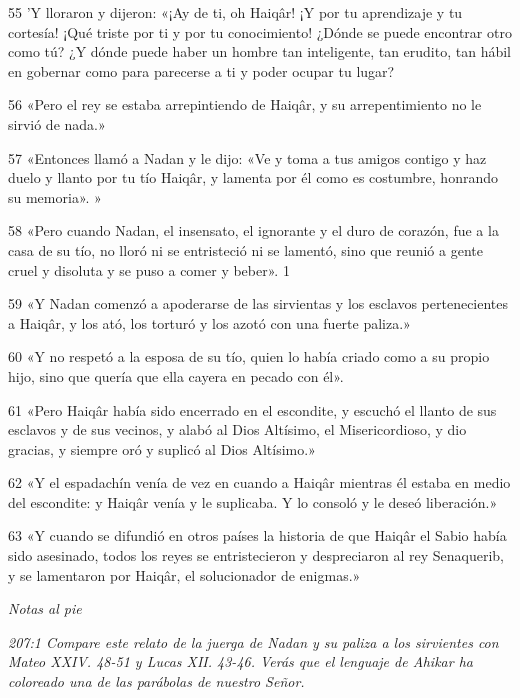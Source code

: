 \par 55 'Y lloraron y dijeron: «¡Ay de ti, oh Haiqâr! ¡Y por tu aprendizaje y tu cortesía! ¡Qué triste por ti y por tu conocimiento! ¿Dónde se puede encontrar otro como tú? ¿Y dónde puede haber un hombre tan inteligente, tan erudito, tan hábil en gobernar como para parecerse a ti y poder ocupar tu lugar?

\par 56 «Pero el rey se estaba arrepintiendo de Haiqâr, y su arrepentimiento no le sirvió de nada.»

\par 57 «Entonces llamó a Nadan y le dijo: «Ve y toma a tus amigos contigo y haz duelo y llanto por tu tío Haiqâr, y lamenta por él como es costumbre, honrando su memoria». »

\par 58 «Pero cuando Nadan, el insensato, el ignorante y el duro de corazón, fue a la casa de su tío, no lloró ni se entristeció ni se lamentó, sino que reunió a gente cruel y disoluta y se puso a comer y beber». 1

\par 59 «Y Nadan comenzó a apoderarse de las sirvientas y los esclavos pertenecientes a Haiqâr, y los ató, los torturó y los azotó con una fuerte paliza.»

\par 60 «Y no respetó a la esposa de su tío, quien lo había criado como a su propio hijo, sino que quería que ella cayera en pecado con él».

\par 61 «Pero Haiqâr había sido encerrado en el escondite, y escuchó el llanto de sus esclavos y de sus vecinos, y alabó al Dios Altísimo, el Misericordioso, y dio gracias, y siempre oró y suplicó al Dios Altísimo.»

\par 62 «Y el espadachín venía de vez en cuando a Haiqâr mientras él estaba en medio del escondite: y Haiqâr venía y le suplicaba. Y lo consoló y le deseó liberación.»

\par 63 «Y cuando se difundió en otros países la historia de que Haiqâr el Sabio había sido asesinado, todos los reyes se entristecieron y despreciaron al rey Senaquerib, y se lamentaron por Haiqâr, el solucionador de enigmas.»

\par \textit{Notas al pie}

\par \textit{207:1 Compare este relato de la juerga de Nadan y su paliza a los sirvientes con Mateo XXIV. 48-51 y Lucas XII. 43-46. Verás que el lenguaje de Ahikar ha coloreado una de las parábolas de nuestro Señor.}

